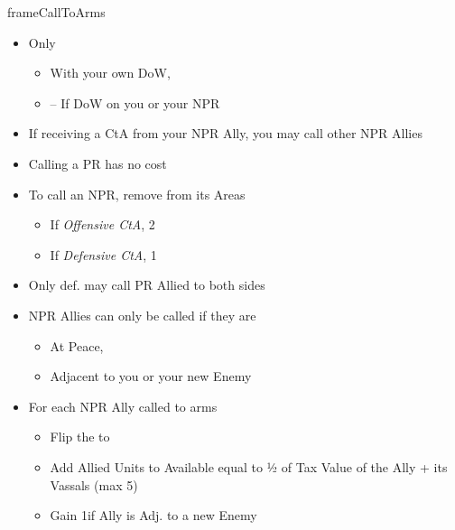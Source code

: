 \documentclass[10pt]{article}
\begin{document}
\begin{dynamiccontents*}{frameCallToArms}
	\begin{multicols}{2}
		\begin{itemize}
			\item Only
			\begin{itemize}
				\item With your own DoW, 
				\item \reaction -- If DoW on you or your NPR \ally
			\end{itemize}
			\item If receiving a CtA from your NPR Ally, you may call other NPR Allies
			\item Calling a PR has no cost
			\item To call an NPR, remove \influence from its Areas
			\begin{itemize}
				\item If \emph{Offensive CtA}, 2\influence
				\item If \emph{Defensive CtA}, 1\influence
			\end{itemize}
			\item Only def. may call PR Allied to both sides
			\item NPR Allies can only be called if they are
			\begin{itemize}
				\item At Peace, 
				\item Adjacent to you or your new Enemy
			\end{itemize}
			\item For each NPR Ally called to arms
			\begin{itemize}
				\item Flip the \alliance to \activeally
				\item Add Allied Units to Available \manpower equal to ½ of Tax Value of the Ally + its Vassals (max 5)
				\item Gain 1\milpower if Ally is Adj. to a new Enemy
			\end{itemize}
		\end{itemize}
	\end{multicols}
\end{dynamiccontents*}
\end{document}
